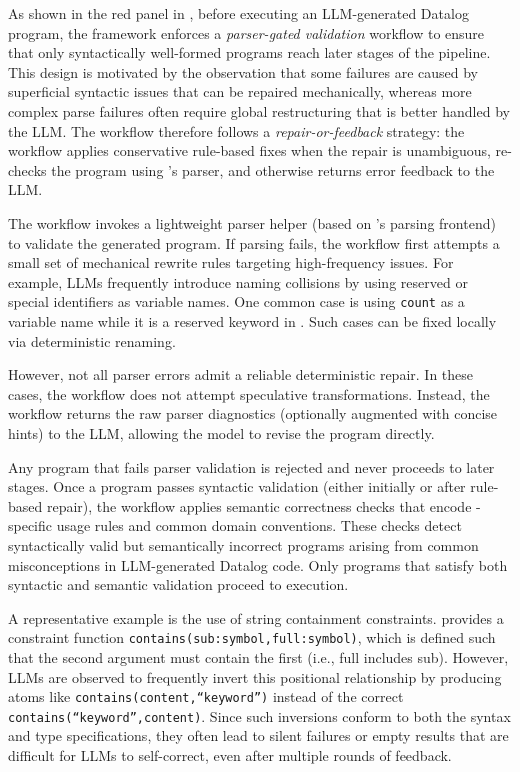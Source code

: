 As shown in the red panel in , before executing an LLM-generated Datalog program, the framework enforces a \emph{parser-gated validation} workflow to ensure that only syntactically well-formed
programs reach later stages of the pipeline. This design is motivated by the observation that some
failures are caused by superficial syntactic issues that can be repaired mechanically, whereas more
complex parse failures often require global restructuring that is better handled by the LLM. The
workflow therefore follows a \emph{repair-or-feedback} strategy: the workflow applies conservative rule-based fixes when the repair is unambiguous, re-checks the program using \souffle's parser, and otherwise returns error feedback to the LLM.


The workflow invokes a lightweight parser helper (based on \souffle's parsing frontend) to validate the
generated program. If parsing fails, the workflow first attempts a small set of mechanical rewrite rules
targeting high-frequency issues. For example, LLMs frequently introduce naming collisions by using
reserved or special identifiers as variable names.
One common case is using \texttt{count} as a variable name while it is a reserved keyword in
\souffle.
Such cases can be fixed locally via deterministic renaming.

However, not all parser errors admit a reliable deterministic repair.
In these cases, the workflow does not attempt speculative transformations. Instead, the workflow returns the raw parser diagnostics (optionally augmented with concise hints) to the LLM, allowing the model to revise the program directly.

Any program that fails parser validation is rejected and never proceeds to later stages. Once a
program passes syntactic validation (either initially or after rule-based repair), the workflow applies semantic correctness checks that encode \souffle-specific usage rules and common domain
conventions. These checks detect syntactically valid but semantically incorrect programs arising
from common misconceptions in LLM-generated Datalog code. Only programs that satisfy both syntactic
and semantic validation proceed to execution.

A representative example is the use of string containment constraints. \souffle provides a constraint function
\texttt{contains(sub:symbol,full:symbol)}, which is defined such that the second argument must
contain the first (i.e., full includes sub). However, LLMs are observed to frequently invert this
positional relationship by producing atoms like \texttt{contains(content,``keyword'')} instead of
the correct \texttt{contains(``keyword'',content)}.
Since such inversions conform to both the syntax and type specifications, they often lead to silent
failures or empty results that are difficult for LLMs to self-correct, even after multiple rounds
of feedback.

